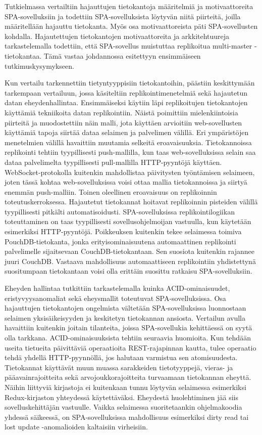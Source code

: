 \documentclass[finnish,twoside,censored,csm,sw-track-2018]{HYthesisML}
\begin{document}
Tutkielmassa vertailtiin hajauttujen tietokantoja määritelmiä ja motivaattoreita SPA-sovelluksiin ja todettiin SPA-sovelluksista löytyvän niitä piirteitä, joilla määritellään hajauttu tietokanta. Myös osa motivaattoreista päti SPA-sovellusten kohdalla. Hajautettujen tietokantojen motivaattoreita ja arkkitehtuureja tarkastelemalla todettiin, että SPA-sovellus muistuttaa replikoitua multi-master -tietokantaa. Tämä vastaa johdannossa esitettyyn ensimmäiseen tutkimuskysymykseen.

Kun vertailu tarkennettiin tietyntyyppisiin tietokantoihin, päästiin keskittymään tarkempaan vertailuun, jossa käsiteltiin replikointimenetelmiä sekä hajautetun datan eheydenhallintaa. Ensimmäiseksi käytiin läpi replikoitujen tietokantojen käyttämiä tekniikoita datan replikointiin. Näistä poimittiin mielenkiintoisia piirteitä ja muodostettiin näin malli, jota käyttäen arvioitiin web-sovellusten käyttämiä tapoja siirtää dataa selaimen ja palvelimen välillä. Eri ympäristöjen menetelmien välillä havaittiin muutamia selkeitä eroavaisuuksia. Tietokannoissa replikointi tehtiin tyypillisesti push-mallilla, kun taas web-sovelluksissa selain saa dataa palvelimelta tyypillisesti pull-mallilla HTTP-pyyntöjä käyttäen. WebSocket-protokolla kuitenkin mahdollistaa päivitysten työntämisen selaimeen, joten tässä kohtaa web-sovelluksissa voisi ottaa mallia tietokannoissa ja siirtyä enemmän push-malliin. Toinen oleellinen eroavaisuus on replikoinnin toteutuskerroksessa. Hajautetut tietokannat hoitavat replikoinnin pisteiden välillä tyypillisesti pitkälti automatisoidusti. SPA-sovelluksissa replikointilogiikan toteuttaminen on taas tyypillisesti sovellusohjelmoijan vastuulla, kun käytetään esimerkiksi HTTP-pyyntöjä. Poikkeuksen kuitenkin tekee selaimessa toimiva PouchDB-tietokanta, jonka erityisominaisuutena automaattinen replikointi palvelimelle sijaitsevaan CouchDB-tietokantaan. Sen suosiota kuitenkin rajannee juuri CouchDB. Vastaava mahdollisuus automaattiseen replikointiin yhdistettynä suositumpaan tietokantaan voisi olla erittäin suosittu ratkaisu SPA-sovelluksiin.

Eheyden hallintaa tutkittiin tarkastelemalla kuinka ACID-ominaisuudet, eristyvyysanomaliat sekä eheysmallit toteutuvat SPA-sovelluksissa. Osa hajauttujen tietokantojen ongelmista vältetään SPA-sovelluksissa luonnostaan selaimen yksisäikeisyyden ja keskitetyn tietokannan ansiosta. Vertailun avulla havaittiin kuitenkin joitain tilanteita, joissa SPA-sovellukia kehittäessä on syytä olla tarkkana. ACID-ominaisuuksista tehtiin seuraavia huomioita. Kun tehdään useita tietueita päivittäviä operaatioita REST-rajapinnan kautta, tulee operaatio tehdä yhdellä HTTP-pyynnöllä, jos halutaan varmistua sen atomisuudesta. Tietokannat käyttävät muun muassa sarakkeiden tietotyyppejä, vieras- ja pääavainrajoitteita sekä arvojoukkorajoitteita turvaamaan tietokannan eheyttä. Näihin liittyviä kirjastoja ei kuitenkaan tunnu löytyvän selaimessa esimerkiksi Redux-kirjaston yhteydessä käytettäväksi. Eheydestä huolehtiminen jää siis sovelluskehittäjän vastuulle. Vaikka selaimessa suoritetaankin ohjelmakoodia yhdessä säikeessä, on SPA-sovelluksissa mahdollisuus esimerkiksi dirty read tai lost update -anomalioiden kaltaisiin virheisiin. 
\end{document}
